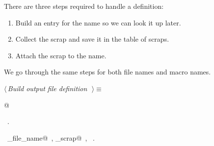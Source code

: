 \documentclass{report}
\begin{document}
There are three steps required to handle a definition:
\begin{enumerate}
  \item Build an entry for the name so we can look it up later.
  \item Collect the scrap and save it in the table of scraps.
  \item Attach the scrap to the name.
\end{enumerate}
We go through the same steps for both file names and macro names.
\begin{flushleft} \small
\begin{minipage}{\linewidth} \label{scrap38}
$\langle\,${\it Build output file definition}\nobreak\ {\footnotesize {}}$\,\rangle\equiv$
\vspace{-1ex}
\begin{list}{}{} \item
\mbox{}@{\NWsep}
\end{list}
\vspace{-1ex}
\footnotesize\addtolength{\baselineskip}{-1ex}
\begin{list}{}{\setlength{\itemsep}{-\parsep}\setlength{\itemindent}{-\leftmargin}}
\item \NWtxtMacroRefIn\ .
\end{list}
\vspace{-2ex}
\footnotesize\addtolength{\baselineskip}{-1ex}
\begin{list}{}{\setlength{\itemsep}{-\parsep}\setlength{\itemindent}{-\leftmargin}}
\item \NWtxtIdentsUsed\nobreak\  \verb@collect_file_name@\nobreak\ , \verb@collect_scrap@\nobreak\ , \verb@Name@\nobreak\ .\end{list}
\end{minipage}\\[4ex]
\end{flushleft}
\end{document}
